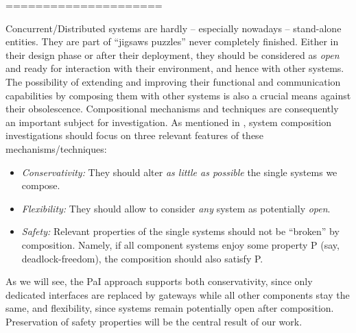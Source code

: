  
 =====================
 
 
 

Concurrent/Distributed systems are  hardly -- especially nowadays -- 
stand-alone entities. They are part of 
``jigsaws puzzles''  
never completely  finished.
Either in their design phase or after their deployment, they should be considered
as {\em open} and  ready for interaction with their environment, and hence with other systems. 
The possibility of extending and improving their functional and communication capabilities
by composing them
with other systems is also a crucial means %
against their obsolescence.
Compositional mechanisms and techniques are consequently an important subject for investigation.
As mentioned in \cite{BDGY23}, system composition investigations should focus on three relevant features
of these mechanisms/techniques:
\begin{itemize}
\item
{\em Conservativity:} 
They should alter {\em as little as possible} the single systems we compose.
\item
{\em Flexibility:} 
%
 They should allow to consider {\em any} system as potentially {\em open}.
\item
{\em Safety:}
Relevant properties of the single systems should not be ``broken'' by composition.
 Namely, if all component systems enjoy some property P (say, deadlock-freedom), the composition should also satisfy P. 
\end{itemize} 


As we will see, the PaI approach supports both conservativity, since only dedicated interfaces are replaced by gateways while all other components stay  the same,   %
and flexibility,  since systems remain potentially open after composition.
Preservation of safety properties will be the central result of our work.




